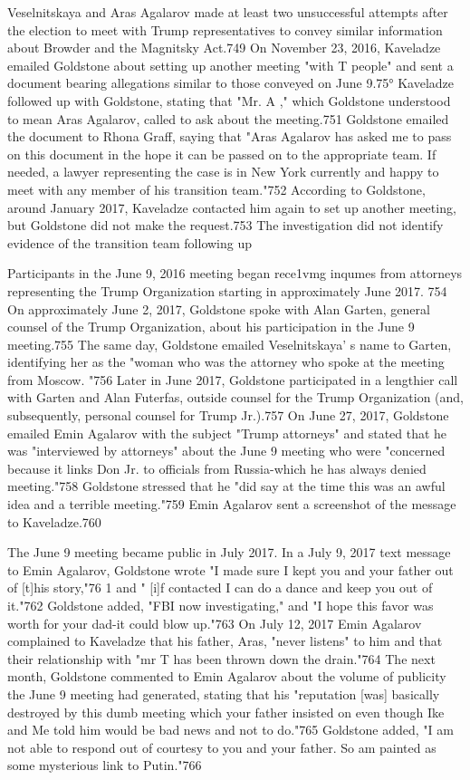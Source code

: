 Veselnitskaya and Aras Agalarov made at least two unsuccessful attempts after the election to meet with Trump representatives to convey similar information about Browder and the Magnitsky Act.749 On November 23, 2016, Kaveladze emailed Goldstone about setting up another meeting "with T people" and sent a  document bearing allegations similar to those conveyed on June 9.75° Kaveladze followed up with Goldstone, stating that "Mr. A ,"  which Goldstone understood to mean Aras Agalarov,  called to ask about the meeting.751 Goldstone emailed the document to Rhona Graff, saying that "Aras Agalarov has asked me to pass on this document in the hope it  can be passed on to the appropriate team. If needed, a  lawyer representing the case is in New York currently and happy to meet with any member of his transition team."752 According to Goldstone, around January 2017, Kaveladze contacted him again to set up another meeting, but Goldstone did not make the request.753 The investigation did not identify evidence of the transition team following up

Participants in the June 9, 2016 meeting began rece1vmg inqumes from attorneys representing the Trump Organization starting in approximately June 2017. 754 On approximately June 2, 2017, Goldstone spoke with Alan Garten, general counsel of the Trump Organization, about his participation in the June 9 meeting.755 The same day, Goldstone emailed Veselnitskaya' s name to Garten, identifying her as the "woman who was the attorney who spoke  at the meeting from Moscow. "756 Later in June 2017, Goldstone participated in a  lengthier call with Garten and Alan Futerfas, outside counsel for the Trump Organization (and,  subsequently, personal counsel for Trump Jr.).757 On June 27, 2017, Goldstone emailed Emin Agalarov with the subject "Trump attorneys" and stated that he was "interviewed by attorneys"  about the June 9 meeting who were "concerned because it links Don Jr. to officials from Russia-which he has always denied meeting."758 Goldstone stressed that he "did say at the time this was an awful idea and a terrible meeting."759 Emin Agalarov sent a  screenshot of the message to Kaveladze.760

The June 9 meeting became public in July 2017. In a  July 9, 2017 text message to Emin Agalarov, Goldstone wrote "I made sure I kept you and your father out of [t]his story,"76 1 and " [i]f contacted I can do a dance and keep you out of it."762 Goldstone added, "FBI now investigating," and "I hope this favor was worth for your dad-it could blow up."763 On July 12, 2017 Emin Agalarov complained to Kaveladze that his father,  Aras,  "never listens" to him and that their relationship with "mr T has been thrown down the drain."764 The next month, Goldstone commented to Emin Agalarov about the volume of publicity the June 9  meeting had generated, stating that his "reputation [was] basically destroyed by this dumb meeting which your father insisted on even though Ike and Me told him would be bad news and not to do."765 Goldstone added, "I am not able to respond out of courtesy to you and your father.  So am painted as some mysterious link to Putin."766

